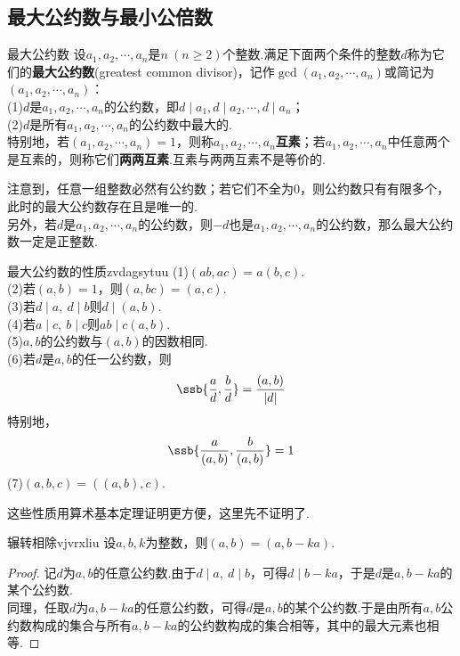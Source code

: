 \subsection{最大公约数与最小公倍数}

\begin{definition}{最大公约数}
	设$a_1,a_2, \cdots ,a_n$是$n~(n \geq 2)$个整数.满足下面两个条件的整数$d$称为它们的\textbf{最大公约数}(greatest common divisor)，记作$\gcd (a_1,a_2, \cdots ,a_n)$或简记为$(a_1,a_2, \cdots ,a_n)$： \\
	(1)$d$是$a_1,a_2, \cdots ,a_n$的公约数，即$d \mid a_1,d \mid a_2, \cdots ,d \mid a_n$； \\
	(2)$d$是所有$a_1,a_2, \cdots ,a_n$的公约数中最大的. \\
	特别地，若$(a_1,a_2, \cdots ,a_n)=1$，则称$a_1,a_2, \cdots ,a_n$\textbf{互素}；若$a_1,a_2, \cdots ,a_n$中任意两个是互素的，则称它们\textbf{两两互素}.互素与两两互素不是等价的.
\end{definition}
\begin{remark}
	注意到，任意一组整数必然有公约数；若它们不全为$0$，则公约数只有有限多个，此时的最大公约数存在且是唯一的.\\ 
	另外，若$d$是$a_1,a_2, \cdots ,a_n$的公约数，则$-d$也是$a_1,a_2, \cdots ,a_n$的公约数，那么最大公约数一定是正整数.
\end{remark}

\begin{theorem}{最大公约数的性质}{zvdagsytuu}
	(1)$(ab,ac)=a(b,c)$. \\ 
	(2)若$(a,b)=1$，则$(a,bc)=(a,c)$. \\
	(3)若$d \mid a,~d \mid b$则$d \mid (a,b)$. \\
	(4)若$a \mid c,~b \mid c$则$ab \mid c(a,b)$. \\
	(5)$a,b$的公约数与$(a,b)$的因数相同. \\
	(6)若$d$是$a,b$的任一公约数，则$$\ssb{\frac{a}{d},\frac{b}{d}} = \frac{(a,b)}{|d|}$$
	特别地，$$\ssb{\frac{a}{(a,b)},\frac{b}{(a,b)}}=1$$
	(7)$(a,b,c)=((a,b),c)$.
\end{theorem}
\begin{remark}
	这些性质用算术基本定理证明更方便，这里先不证明了.
\end{remark}

\begin{theorem}{辗转相除}{vjvrxliu}
	设$a,b,k$为整数，则$(a,b)=(a,b-ka)$.
\end{theorem}
\begin{proof}
	记$d$为$a,b$的任意公约数.由于$d \mid a,~d \mid b$，可得$d \mid b-ka$，于是$d$是$a,b-ka$的某个公约数. \\
	同理，任取$d$为$a,b-ka$的任意公约数，可得$d$是$a,b$的某个公约数.于是由所有$a,b$公约数构成的集合与所有$a,b-ka$的公约数构成的集合相等，其中的最大元素也相等.
\end{proof}

